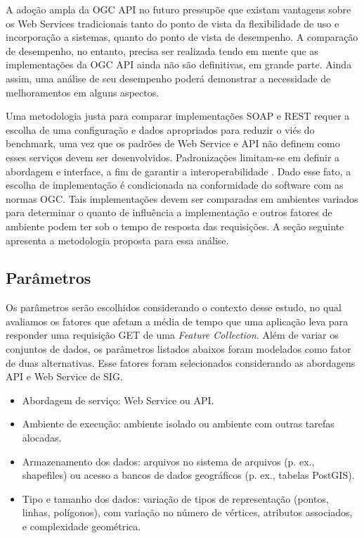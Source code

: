 A adoção ampla da OGC API no futuro pressupõe que existam vantagens sobre os Web Services tradicionais tanto do ponto de vista da flexibilidade de uso e incorporação a sistemas, quanto do ponto de vista de desempenho. A comparação de desempenho, no entanto, precisa ser realizada tendo em mente que as implementações da OGC API ainda não são definitivas, em grande parte. Ainda assim, uma análise de seu desempenho poderá demonstrar a necessidade de melhoramentos em alguns aspectos.

Uma metodologia justa para comparar implementações SOAP e REST requer a escolha de uma configuração e dados apropriados para reduzir o viés do benchmark, uma vez que os padrões de Web Service e API não definem como esses serviços devem ser desenvolvidos. Padronizações limitam-se em definir a abordagem e interface, a fim de garantir a interoperabilidade \cite{introows}. Dado esse fato, a escolha de implementação é condicionada na conformidade do software com as normas OGC. Tais implementações devem ser comparadas em ambientes variados para determinar o quanto de influência a implementação e outros fatores de ambiente podem ter sob o tempo de resposta das requisições. A seção seguinte apresenta a metodologia proposta para essa análise.

\subsection{Parâmetros}

Os parâmetros serão escolhidos considerando o contexto desse estudo, no qual avaliamos os fatores que afetam a média de tempo que uma aplicação leva para responder uma requisição GET 
 de uma \textit{Feature Collection}. Além de variar os conjuntos de dados, os parâmetros listados abaixos foram modelados como fator de duas alternativas. Esse fatores foram selecionados considerando as abordagens API e Web Service de SIG.

\begin{itemize}
    \item Abordagem de serviço: Web Service ou API.
    \item Ambiente de execução: ambiente isolado ou ambiente com outras tarefas alocadas.
    \item Armazenamento dos dados: arquivos no sistema de arquivos (p. ex., shapefiles) ou acesso a bancos de dados geográficos (p. ex., tabelas PostGIS).
    \item Tipo e tamanho dos dados: variação de tipos de representação (pontos, linhas, polígonos), com variação no número de vértices, atributos associados, e complexidade geométrica.
\end{itemize}


